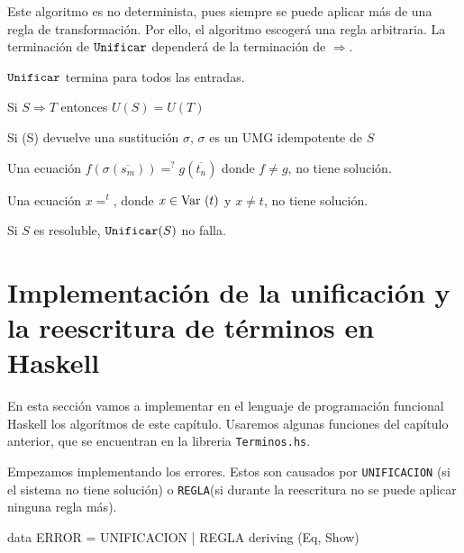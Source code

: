 Este algoritmo es no determinista, pues siempre se puede aplicar más
de una regla de transformación. Por ello, el algoritmo escogerá una
regla arbitraria. La terminación de $\mbox{\texttt{Unificar}}$ dependerá de la
terminación de $\Longrightarrow$.

\begin{lema} 
  $\mbox{\texttt{Unificar}}$ termina para todos las entradas.
\end{lema}

\begin{lema}
  Si $S \Longrightarrow T$ entonces $U(S) = U(T)$
\end{lema}

\begin{lema} 
  Si \Unify(S) devuelve una sustitución $\sigma$, $\sigma$ es un UMG
  idempotente de $S$
\end{lema}


\begin{lema}
  Una ecuación $f(\sigma(\overline{s_m})) =^?  g(\overline{t_n})$
  donde $f \not = g$, no tiene solución.
\end{lema}

\begin{lema}
  Una ecuación $x =^ t$, donde $x \in \mbox{Var }(t)$ y $x \not = t$, no
  tiene solución.
\end{lema}

\begin{lema} 
  Si $S$ es resoluble, $\mbox{\texttt{Unificar}}(S)$ no falla.
\end{lema}

\section{Implementación de la unificación y la reescritura de términos
  en Haskell}

En esta sección vamos a implementar en el lenguaje de programación
funcional Haskell los algorítmos de este capítulo. Usaremos algunas
funciones del capítulo anterior, que se encuentran en la libreria
\texttt{Terminos.hs}.

Empezamos implementando los errores. Estos son causados por
\texttt{UNIFICACION} (si el sistema no tiene solución) o
\texttt{REGLA}(si durante la reescritura no se
puede aplicar ninguna regla más).
\begin{codigo}
data ERROR = UNIFICACION
           | REGLA
           deriving (Eq, Show)
\end{codigo}

